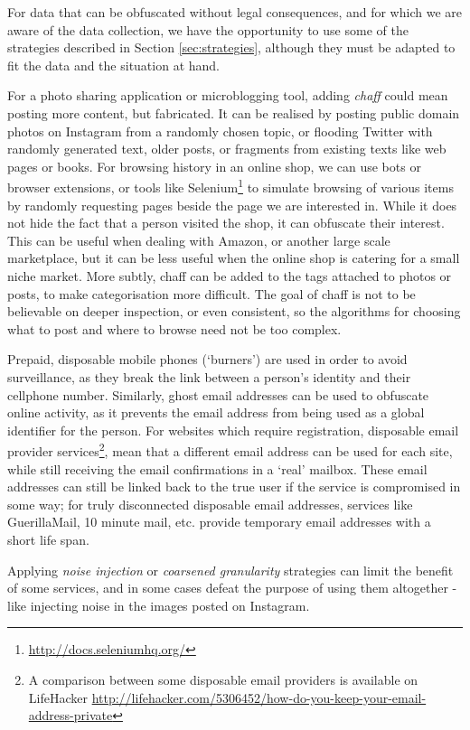 \documentclass{IOS-Book-Article}     %
\begin{document}
For data that can be obfuscated without legal consequences, and for 
which we are aware of the data collection, we have the opportunity to use some
of the strategies described in Section \ref{sec:strategies}, although they must
be adapted to fit the data and the situation at hand.

For a photo sharing application or microblogging tool, adding \emph{chaff} 
could mean posting more content, but fabricated. 
It can be realised by posting public domain photos on Instagram from a randomly 
chosen topic, or flooding Twitter with randomly generated text, older posts, or 
fragments from existing texts like web pages or books. For browsing history in 
an online shop, we can use bots or browser extensions, 
or tools like Selenium\footnote{\url{http://docs.seleniumhq.org/}}
to simulate browsing of various items by randomly requesting 
pages beside the page we are interested in. While it does 
not hide the fact that a person visited the shop, it can obfuscate their interest. 
This can be useful when dealing with Amazon, or another large scale marketplace, 
but it can be less useful when the online shop is catering for a small niche 
market. More subtly, chaff can be added to the tags attached to photos or posts,
to make categorisation more difficult. 
The goal of chaff is not to be believable
on deeper inspection, or even consistent, so the algorithms for choosing 
what to post and where to browse need not be too complex. 

Prepaid, disposable mobile phones (`burners') are used in order to avoid
surveillance, as they break the link between a person's identity and their
cellphone number.
Similarly, ghost email addresses can be used to obfuscate online activity, as it
prevents the email address from being used as a global identifier for the person. For websites which 
require registration, 
disposable email provider services\footnote{A comparison between 
some disposable email providers is available on LifeHacker 
\url{http://lifehacker.com/5306452/how-do-you-keep-your-email-address-private}}, 
mean that a different email address can be used for each site, while still 
receiving the email confirmations in a `real' mailbox. These email addresses can 
still be linked back to the true user if the service is compromised 
in some way; for truly disconnected disposable email addresses, services like 
GuerillaMail, 10 minute mail, etc. provide temporary email addresses with a 
short life span. 

Applying \emph{noise injection} or \emph{coarsened granularity} strategies can 
limit the benefit of some services, and in some cases defeat the purpose of 
using them altogether - like injecting noise in the images posted on Instagram.
\end{document}
